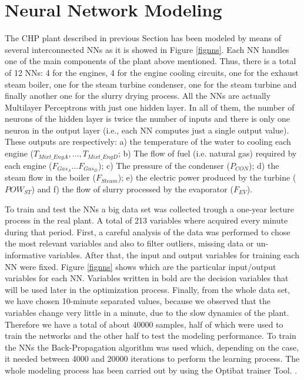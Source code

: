 \section{Neural Network Modeling}
\label{NN}

The CHP plant described in previous Section has been modeled by means of several interconnected NNs as it is showed in Figure \ref{fignns}. Each NN handles one of the main components of the plant above mentioned. Thus, there is a total of 12 NNs: 4 for the engines, 4 for the engine cooling  circuits, one for the exhaust steam boiler, one for the steam turbine condenser, one for the steam turbine and finally another one for the slurry drying process. All the NNs are actually Multilayer Perceptrons with just one hidden layer. In all of them, the number of neurons of the hidden layer is twice the number of inputs and there is only one neuron in the output layer (i.e., each NN computes just a single output value). These outputs are respectively: a) the temperature of the water to cooling each engine ($T_{Mixt\_EngA}, \dots, T_{Mixt\_EngD}$; b) The flow of fuel (i.e. natural gas) required by each engine ($F_{Gas_A} \dots F_{Gas_D}$); c) The pressure of the condenser ($P_{CON}$); d) the steam flow in the boiler ($F_{Steam}$); e) the electric power produced by the turbine ($POW_{ST}$) and f) the flow of slurry processed by the evaporator ($F_{EV}$). 

To train and test the NNs a big data set was collected trough a one-year lecture process in the real plant. A total of  213 variables where acquired every minute during that period. First, a careful analysis of the data was performed to chose the most relevant variables and also to filter outliers, missing data or un-informative variables. %
After that, the input and output variables for training each NN were fixed. Figure \ref{fignns} shows which are the particular input/output variables for each NN. Variables written in bold are the decision variables that will be used later in the optimization process. Finally, from the whole data set, we have chosen 10-minute separated values, because we observed that the variables change very little in a minute, due to the slow dynamics of the plant. Therefore we have a total of about \num{40000} samples, half of which were used to train the networks and the other half to test the modeling performance. To train the NNs the Back-Propagation algorithm was used which, depending on the case, it needed between \num{4000} and \num{20000} iterations to perform the learning process. %
The whole modeling process has been carried out by using the Optibat trainer Tool. .

